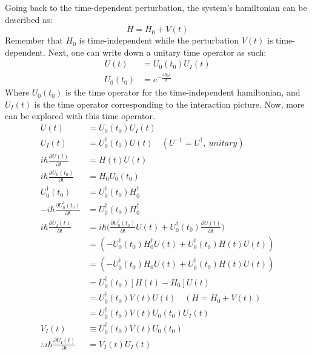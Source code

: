 \documentclass{article}
\begin{document}
\begin{flushleft}
Going back to the time-dependent perturbation, the system's hamiltonian can be described as:
$$H=H_0+V(t)$$
Remember that $H_0$ is time-independent while the perturbation $V(t)$ is time-dependent. Next, one can write down a unitary time operator as such:
\begin{align*}
    U(t)&=U_0(t_0)U_I(t)\\
    U_0(t_0)&=e^{-\frac{iH_0t}{\hbar}}
\end{align*}
Where $U_0(t_0)$ is the time operator for the time-independent hamiltonian, and $U_I(t)$ is the time operator corresponding to the interaction picture. Now, more can be explored with this time operator.
\begin{align*}
    U(t)&=U_0(t_0)U_I(t)\\
    U_I(t)&=U_0^\dagger(t_0) U(t)\quad (U^{-1}=U^\dagger,\ unitary)\\
    i\hbar\frac{\partial U(t)}{\partial t}&=H(t)U(t)\\
    i\hbar\frac{\partial U_0(t_0)}{\partial t}&=H_0U_0(t_0)\\
    U_0^\dagger(t_0)&=U_0^\dagger(t_0) H_0^\dagger\\
    -i\hbar\frac{\partial U_0^\dagger(t_0)}{\partial t}&=U_0^\dagger(t_0) H_0^\dagger\\
    i\hbar\frac{\partial U_I(t)}{\partial t}&=i\hbar\bigg(\frac{\partial U_0^\dagger(t_0)}{\partial t}U(t)+U_0^\dagger(t_0)\frac{\partial U(t)}{\partial t}\bigg)\\
    &=(-U_0^\dagger(t_0)H_0^\dagger U(t)+U_0^\dagger(t_0) H(t)U(t))\\
    &=(-U_0^\dagger(t_0)H_0U(t)+U_0^\dagger(t_0) H(t)U(t))\\
    &=U_0^\dagger(t_0)[H(t)-H_0]U(t)\\
    &=U_0^\dagger(t_0) V(t)U(t)\quad (H=H_0+V(t))\\
    &=U_0^\dagger(t_0) V(t)U_0(t_0)U_I(t)\\
    V_I(t)&\equiv U_0^\dagger(t_0) V(t)U_0(t_0)\\
    \therefore i\hbar\frac{\partial U_I(t)}{\partial t}&=V_I(t)U_I(t)\label{eq}\tag{8.1}
    \end{align*}

    


\end{flushleft}
\end{document}
